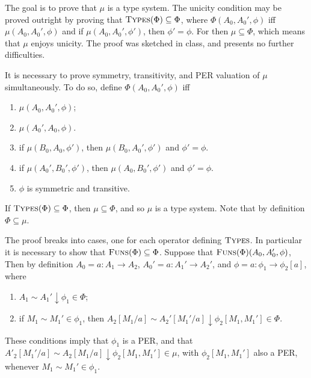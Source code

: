 \documentclass[11pt,twoside]{article}
\newcommand{\DFun}[3]{{#2}{:}{#1}\to{#3}}
\begin{document}
The goal is to prove that $\mu$ is a type system.  The unicity condition may be proved
outright by proving that $\textsc{Types}(\Phi)\subseteq\Phi$, where
$\Phi(A_{0},A_{0}',\phi)$ iff $\mu(A_{0},A_{0}',\phi)$ and if $\mu(A_{0},A_{0}',\phi')$, then
$\phi'=\phi$.  For then $\mu\subseteq\Phi$, which means that $\mu$ enjoys unicity.  The proof was sketched in
class, and presents no further difficulties.

It is necessary to prove symmetry, transitivity, and PER valuation of $\mu$ simultaneously.
To do so, define $\Phi(A_{0},A_{0}',\phi)$ iff
\begin{enumerate}
\item $\mu(A_{0},A_{0}',\phi)$;
\item $\mu(A_{0}',A_{0},\phi)$.
\item if $\mu(B_0,A_0,\phi')$, then $\mu(B_{0},A_{0}',\phi')$ and $\phi'=\phi$.
\item if $\mu(A_{0}',B_{0}',\phi')$, then $\mu(A_{0},B_{0}',\phi')$ and $\phi'=\phi$.
\item $\phi$ is symmetric and transitive.
\end{enumerate}
If $\textsc{Types}(\Phi)\subseteq\Phi$, then $\mu\subseteq\Phi$, and so $\mu$ is a type system.  Note that by
definition $\Phi\subseteq\mu$.

\bigskip

The proof breaks into cases, one for each operator defining $\textsc{Types}$.  In
particular it is necessary to show that $\textsc{Funs}(\Phi)\subseteq\Phi$.  Suppose that
$\textsc{Funs}(\Phi)(A_{0},A_{0}',\phi)$, Then by definition
$A_{0}=\DFun{A_{1}}{a}{A_{2}}$, $A_{0}'=\DFun{A_{1}'}{a}{A_{2}'}$, and
$\phi=\DFun{\phi_{1}}{a}{\phi_{2}[a]}$, where
\begin{enumerate}
\item $A_{1}\sim A_{1}'\downarrow\phi_{1}\in\Phi$;
\item if $M_1\sim M_1'\in\phi_{1}$, then $A_{2}[M_1/a]\sim A_{2}'[M_1'/a]\downarrow\phi_{2}[M_1,M_1']\in\Phi$.
\end{enumerate}
These conditions imply that $\phi_{1}$ is a PER, and that
$A'_{2}[M_1'/a]\sim A_{2}[M_1/a]\downarrow \phi_{2}[M_1,M_1']\in\mu$, with
$\phi_{2}[M_1,M_1']$ also a PER, whenever $M_1\sim M_1'\in\phi_{1}$.
\end{document}
